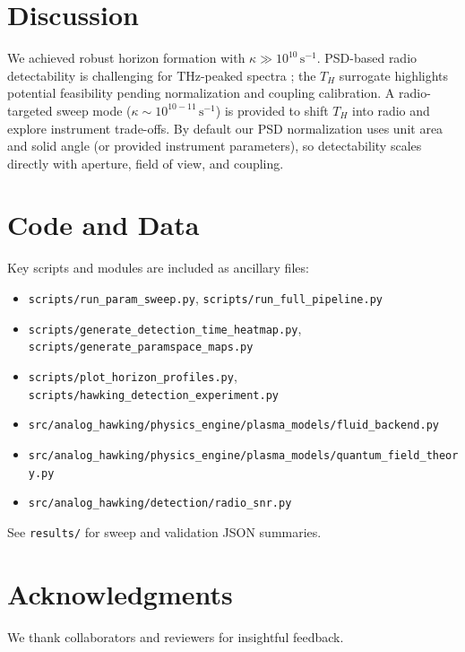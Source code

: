 \documentclass[11pt]{article}
\begin{document}
\section{Discussion}
We achieved robust horizon formation with $\kappa\gg 10^{10}\,\mathrm{s^{-1}}$. PSD-based radio detectability is challenging for THz-peaked spectra \cite{Tonouchi2007}; the $T_H$ surrogate highlights potential feasibility pending normalization and coupling calibration. A radio-targeted sweep mode ($\kappa \sim 10^{10-11}\,\mathrm{s^{-1}}$) is provided to shift $T_H$ into radio and explore instrument trade-offs. By default our PSD normalization uses unit area and solid angle (or provided instrument parameters), so detectability scales directly with aperture, field of view, and coupling.

\section{Code and Data}
Key scripts and modules are included as ancillary files:
\begin{itemize}
  \item \texttt{scripts/run\_param\_sweep.py}, \texttt{scripts/run\_full\_pipeline.py}
  \item \texttt{scripts/generate\_detection\_time\_heatmap.py}, \texttt{scripts/generate\_paramspace\_maps.py}
  \item \texttt{scripts/plot\_horizon\_profiles.py}, \texttt{scripts/hawking\_detection\_experiment.py}
  \item \texttt{src/analog\_hawking/physics\_engine/plasma\_models/fluid\_backend.py}
  \item \texttt{src/analog\_hawking/physics\_engine/plasma\_models/quantum\_field\_theory.py}
  \item \texttt{src/analog\_hawking/detection/radio\_snr.py}
\end{itemize}
See \texttt{results/} for sweep and validation JSON summaries.

\section*{Acknowledgments}
We thank collaborators and reviewers for insightful feedback.



\end{document}

